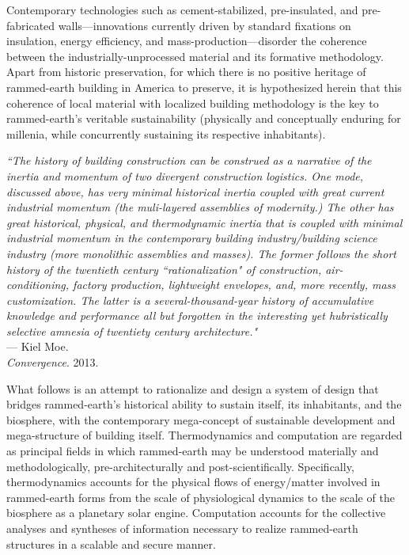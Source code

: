 Contemporary technologies such as cement-stabilized, pre-insulated, and pre-fabricated walls---innovations currently driven by standard fixations on insulation, energy efficiency, and mass-production---disorder the coherence between the industrially-unprocessed material and its formative methodology. Apart from historic preservation, for which there is no positive heritage of rammed-earth building in America to preserve, it is hypothesized herein that this coherence of local material with localized building methodology is the key to rammed-earth's veritable sustainability (physically and conceptually enduring for millenia, while concurrently sustaining its respective inhabitants).

\begin{flushright}
  \small{
  \textit{``The history of building construction can be construed as a narrative of the inertia and momentum of two divergent construction logistics. One mode, discussed above, has very minimal historical inertia coupled with great current industrial momentum (the muli-layered assemblies of modernity.) The other has great historical, physical, and thermodynamic inertia that is coupled with minimal industrial momentum in the contemporary building industry/building science industry (more monolithic assemblies and masses). The former follows the short history of the twentieth century ``rationalization" of construction, air-conditioning, factory production, lightweight envelopes, and, more recently, mass customization. The latter is a several-thousand-year history of accumulative knowledge and performance all but forgotten in the interesting yet hubristically selective amnesia of twentiety century architecture."}}\\ --- Kiel Moe. \\ \textit{Convergence}. 2013.
\end{flushright}

What follows is an attempt to rationalize and design a system of design that bridges rammed-earth's historical ability to sustain itself, its inhabitants, and the biosphere, with the contemporary mega-concept of sustainable development and mega-structure of building itself. Thermodynamics and computation are regarded as principal fields in which rammed-earth may be understood materially and methodologically, pre-architecturally and post-scientifically. Specifically, thermodynamics accounts for the physical flows of energy/matter involved in rammed-earth forms from the scale of physiological dynamics to the scale of the biosphere as a planetary solar engine. Computation accounts for the collective analyses and syntheses of information necessary to realize rammed-earth structures in a scalable and secure manner.
